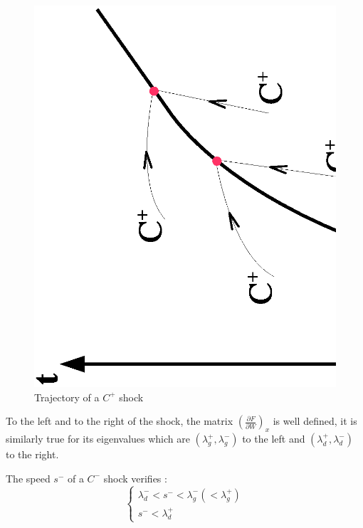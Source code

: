 \begin{figure}
 \begin{center}
  \includegraphics[scale=0.5,angle=270]{Figures/Trajec_Choc.eps} \hspace{2cm}
  \vspace{1.cm}
  \caption{Trajectory of a $C^+$ shock}
 \end{center}
\end{figure}

To the left and to the right of the shock, the matrix $\left ( \frac{\partial F}{\partial W} \right )_x$ is well defined, it is similarly true for its eigenvalues which are $(\lambda_{g}^+,\lambda_{g}^-)$ to the left and $(\lambda_{d}^+,\lambda_{d}^-)$ to the right.

\vspace{0.5cm}

The speed $s^-$ of a $C^-$ shock verifies :
\begin{equation}
  \left \lbrace
  \begin{array}{l}
    \lambda_{d}^- < s^- < \lambda_{g}^- (< \lambda_{g}^+) \\
    s^- < \lambda_{d}^+
  \end{array}
 \right.
\end{equation}

